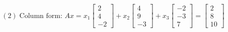 \documentclass[preview]{standalone}
\begin{document}
\begin{align*}
(2)\; \text{Column form: } A x = x_1 \begin{bmatrix}2\\4\\-2\end{bmatrix}+ x_2 \begin{bmatrix}4\\9\\-3\end{bmatrix}+ x_3 \begin{bmatrix}-2\\-3\\7\end{bmatrix} = \begin{bmatrix}2\\8\\10\end{bmatrix}
\end{align*}
\end{document}
